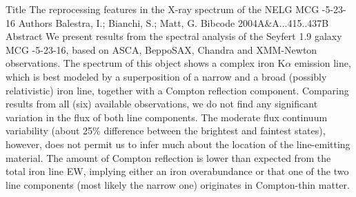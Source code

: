 \documentclass[main.tex]{subfiles}
\begin{document}
Title	The reprocessing features in the X-ray spectrum of the NELG MCG -5-23-16
Authors	Balestra, I.; Bianchi, S.; Matt, G.
Bibcode	2004A\&A...415..437B
Abstract	We present results from the spectral analysis of the Seyfert 1.9 galaxy MCG -5-23-16, based on ASCA, BeppoSAX, Chandra and XMM-Newton observations. The spectrum of this object shows a complex iron K$\alpha$ emission line, which is best modeled by a superposition of a narrow and a broad (possibly relativistic) iron line, together with a Compton reflection component. Comparing results from all (six) available observations, we do not find any significant variation in the flux of both line components. The moderate flux continuum variability (about 25\% difference between the brightest and faintest states), however, does not permit us to infer much about the location of the line-emitting material. The amount of Compton reflection is lower than expected from the total iron line EW, implying either an iron overabundance or that one of the two line components (most likely the narrow one) originates in Compton-thin matter.
\end{document}
